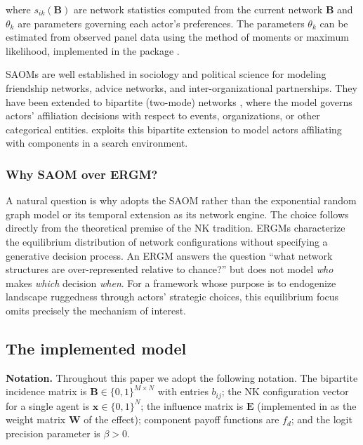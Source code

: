 \documentclass[
  article]{jss}
\begin{document}
\noindent where \(s_{ik}(\mathbf{B})\) are network statistics computed
from the current network \(\mathbf{B}\) and \(\theta_k\) are parameters
governing each actor's preferences. The parameters \(\theta_k\) can be
estimated from observed panel data using the method of moments or
maximum likelihood, implemented in the  package
\citep{RSiena}.

SAOMs are well established in sociology and political science for
modeling friendship networks, advice networks, and inter-organizational
partnerships. They have been extended to bipartite (two-mode) networks
\citep{Koskinen2012}, where the model governs actors' affiliation
decisions with respect to events, organizations, or other categorical
entities.  exploits this bipartite extension to model
actors affiliating with components in a search environment.

\subsubsection{Why SAOM over ERGM?}\label{sec:saom-ergm}

A natural question is why  adopts the SAOM rather than
the exponential random graph model
\citep[ERGM;][]{LusherKoskinenRobins2012} or its temporal extension
\citep[TERGM;][]{Hanneke2010} as its network engine. The choice follows
directly from the theoretical premise of the NK tradition. ERGMs
characterize the equilibrium distribution of network configurations
without specifying a generative decision process. An ERGM answers the
question ``what network structures are over-represented relative to
chance?'' but does not model \emph{who} makes \emph{which} decision
\emph{when}. For a framework whose purpose is to endogenize landscape
ruggedness through actors' strategic choices, this equilibrium focus
omits precisely the mechanism of interest.

\subsection{The implemented model}\label{sec:framework}

\noindent \textbf{Notation.} Throughout this paper we adopt the
following notation. The bipartite incidence matrix is
\(\mathbf{B} \in \{0,1\}^{M \times N}\) with entries \(b_{ij}\); the NK
configuration vector for a single agent is \(\mathbf{x} \in \{0,1\}^N\);
the influence matrix is \(\mathbf{E}\) (implemented in  as
the weight matrix \(\mathbf{W}\) of the  effect); component
payoff functions are \(f_d\); and the logit precision parameter is
\(\beta > 0\).
\end{document}
